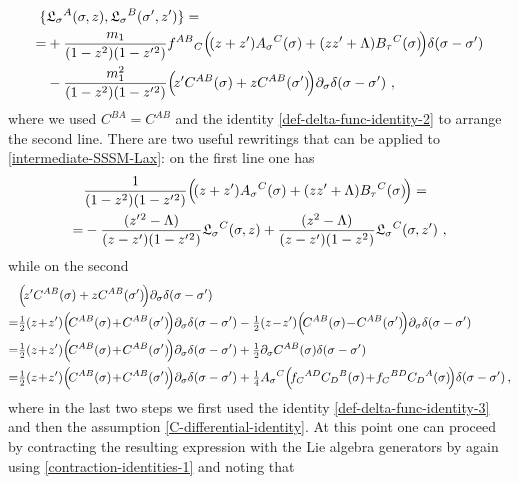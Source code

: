 \documentclass[12pt]{article}
\numberwithin{equation}{section}
\begin{document}
\begin{equation}\label{intermediate-SSSM-Lax}
\begin{aligned}
\{& \mathfrak{L}_{\sigma}{}^{A}(\sigma,z),\mathfrak{L}_{\sigma}{}^{B}(\sigma',z') \}=
\\
=&+\frac{m_{1}}{(1-z^2)(1-z'{}^2)}f^{AB}{}_{C}\Bigl(\! (z+z')A_{\sigma}{}^{C}(\sigma)+(zz'+\Lambda)B_{\tau}{}^{C}(\sigma) \! \Bigr)\delta(\sigma-\sigma')
\\
&-
\frac{m_{1}^2}{(1-z^2)(1-z'{}^2)}\Bigl(\!z'C^{AB}(\sigma)+zC^{AB}(\sigma') \! \Bigr)\partial_{\sigma}\delta(\sigma-\sigma') \,\, ,
\end{aligned}
\end{equation}
where we used $C^{BA}=C^{AB}$ and the identity \eqref{def-delta-func-identity-2} to arrange the second line. There are two useful rewritings that can be applied to \eqref{intermediate-SSSM-Lax}: on the first line one has
\begin{equation}
\begin{aligned}
&\frac{1}{(1-z^2)(1-z'{}^2)}\Bigl(\! (z+z')A_{\sigma}{}^{C}(\sigma)+(zz'+\Lambda)B_{\tau}{}^{C}(\sigma) \! \Bigr)=
\\
=&-\frac{(z'{}^2-\Lambda)}{(z-z')(1-z'{}^2)}\mathfrak{L}_{\sigma}{}^{C}(\sigma,z)+\frac{(z^2-\Lambda)}{(z-z')(1-z^2)}\mathfrak{L}_{\sigma}{}^{C}(\sigma,z') \,\, ,
\end{aligned}
\end{equation}
while on the second 
\begin{align}\label{int-1}
&\Bigl(\!z'C^{AB}(\sigma)+zC^{AB}(\sigma') \! \Bigr)\partial_{\sigma}\delta(\sigma-\sigma')
\\
=&\tfrac{1}{2}(z\!+\!z')\Bigl( \! C^{AB}(\sigma)\!+\!C^{AB}(\sigma') \! \Bigr)\partial_{\sigma}\delta(\sigma-\sigma')-\tfrac{1}{2}(z\!-\!z')\Bigl( \! C^{AB}(\sigma)\!-\!C^{AB}(\sigma') \! \Bigr)\partial_{\sigma}\delta(\sigma-\sigma') 
\notag \\
=& \tfrac{1}{2}(z\!+\!z')\Bigl( \! C^{AB}(\sigma)\!+\!C^{AB}(\sigma') \! \Bigr)\partial_{\sigma}\delta(\sigma-\sigma')+\tfrac{1}{2}\partial_{\sigma}C^{AB}(\sigma)\delta(\sigma-\sigma')
\notag \\
=&\tfrac{1}{2}(z\!+\!z')\Bigl( \! C^{AB}(\sigma)\!+\!C^{AB}(\sigma') \! \Bigr)\partial_{\sigma}\delta(\sigma-\sigma')+\tfrac{1}{4}A_{\sigma}{}^{C}\Bigl(\!f_{C}{}^{AD}C_{D}{}^{B}(\sigma)\!+\!f_{C}{}^{BD}C_{D}{}^{A}(\sigma)\!\Bigr)\delta(\sigma-\sigma') \, ,
\notag 
\end{align}
where in the last two steps we first used the identity \eqref{def-delta-func-identity-3} and then the assumption \eqref{C-differential-identity}. At this point one can proceed by contracting the resulting expression with the Lie algebra generators by again using \eqref{contraction-identities-1} and noting that
\end{document}
